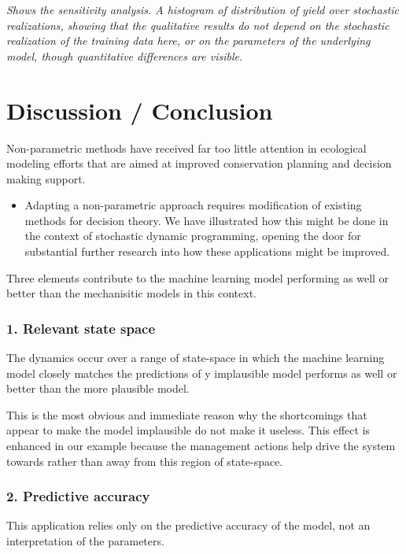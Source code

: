 \documentclass[author-year, review]{elsarticle} %
\begin{document}
\emph{Shows the sensitivity analysis. A histogram of distribution of
yield over stochastic realizations, showing that the qualitative results
do not depend on the stochastic realization of the training data here,
or on the parameters of the underlying model, though quantitative
differences are visible.}

\section{Discussion / Conclusion}

Non-parametric methods have received far too little attention in
ecological modeling efforts that are aimed at improved conservation
planning and decision making support.

\begin{itemize}
\itemsep1pt\parskip0pt
\item
  Adapting a non-parametric approach requires modification of existing
  methods for decision theory. We have illustrated how this might be
  done in the context of stochastic dynamic programming, opening the
  door for substantial further research into how these applications
  might be improved.
\end{itemize}

Three elements contribute to the machine learning model performing as
well or better than the mechanisitic models in this context.

\subsubsection{1. Relevant state space}

The dynamics occur over a range of state-space in which the machine
learning model closely matches the predictions of y implausible model
performs as well or better than the more plausible model.

This is the most obvious and immediate reason why the shortcomings that
appear to make the model implausible do not make it useless. This effect
is enhanced in our example because the management actions help drive the
system towards rather than away from this region of state-space.

\subsubsection{2. Predictive accuracy}

This application relies only on the predictive accuracy of the model,
not an interpretation of the parameters.
\end{document}
